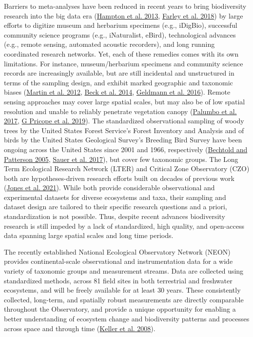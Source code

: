 \documentclass[
  12pt,
]{article}
\begin{document}
Barriers to meta-analyses have been reduced in recent years to bring biodiversity research into the big data era (\protect\hyperlink{ref-hampton2013big}{Hampton et al. 2013}, \protect\hyperlink{ref-farley2018situating}{Farley et al. 2018}) by large efforts to digitize museum and herbarium specimens (e.g., iDigBio), successful community science programs (e.g., iNaturalist, eBird), technological advances (e.g., remote sensing, automated acoustic recorders), and long running coordinated research networks. Yet, each of these remedies comes with its own limitations. For instance, museum/herbarium specimens and community science records are increasingly available, but are still incidental and unstructured in terms of the sampling design, and exhibit marked geographic and taxonomic biases (\protect\hyperlink{ref-martin2012mapping}{Martin et al. 2012}, \protect\hyperlink{ref-beck2014spatial}{Beck et al. 2014}, \protect\hyperlink{ref-geldmann2016determines}{Geldmann et al. 2016}). Remote sensing approaches may cover large spatial scales, but may also be of low spatial resolution and unable to reliably penetrate vegetation canopy (\protect\hyperlink{ref-palumbo2017building}{Palumbo et al. 2017}, \protect\hyperlink{ref-g2019remote}{G Pricope et al. 2019}). The standardized observational sampling of woody trees by the United States Forest Service's Forest Inventory and Analysis and of birds by the United States Geological Survey's Breeding Bird Survey have been ongoing across the United States since 2001 and 1966, respectively (\protect\hyperlink{ref-bechtold2005enhanced}{Bechtold and Patterson 2005}, \protect\hyperlink{ref-sauer2017first}{Sauer et al. 2017}), but cover few taxonomic groups. The Long Term Ecological Research Network (LTER) and Critical Zone Observatory (CZO) both are hypotheses-driven research efforts built on decades of previous work (\protect\hyperlink{ref-jones2021synergies}{Jones et al. 2021}). While both provide considerable observational and experimental datasets for diverse ecosystems and taxa, their sampling and dataset design are tailored to their specific research questions and a priori, standardization is not possible. Thus, despite recent advances biodiversity research is still impeded by a lack of standardized, high quality, and open-access data spanning large spatial scales and long time periods.

The recently established National Ecological Observatory Network (NEON) provides continental-scale observational and instrumentation data for a wide variety of taxonomic groups and measurement streams. Data are collected using standardized methods, across 81 field sites in both terrestrial and freshwater ecosystems, and will be freely available for at least 30 years. These consistently collected, long-term, and spatially robust measurements are directly comparable throughout the Observatory, and provide a unique opportunity for enabling a better understanding of ecosystem change and biodiversity patterns and processes across space and through time (\protect\hyperlink{ref-keller2008continental}{Keller et al. 2008}).
\end{document}
